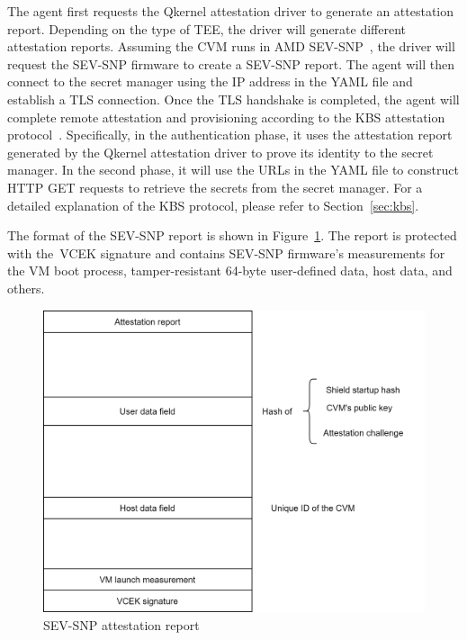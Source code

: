 The agent first requests the Qkernel attestation driver to generate an attestation report. Depending on the type of TEE, the driver will generate different attestation reports. Assuming the CVM runs in AMD SEV-SNP~\cite*{SEV_SNP_white_book}, the driver will request the SEV-SNP firmware to create a SEV-SNP report. The agent will then connect to the secret manager 
using the IP address in the YAML file and establish a TLS connection. Once the TLS handshake is completed, the agent will complete remote attestation and provisioning according to the KBS attestation protocol~\cite*{kbs_Attestation_protocol}. Specifically, in the authentication phase, it uses the attestation report generated by the Qkernel attestation driver to 
prove its identity to the secret manager. In the second phase, it will use the URLs in the YAML file to construct HTTP GET requests to retrieve the secrets from the secret manager. For a detailed explanation of the KBS protocol, please refer to Section~\ref{sec:kbs}.

The format of the SEV-SNP report is shown in Figure~\ref*{fig:attestation_report_format}. The report is protected with the~\acrshort{VCEK} signature and contains SEV-SNP firmware's measurements for the VM boot process, tamper-resistant 64-byte user-defined data, host data, and others. 


\begin{figure}[!htb]
    \centering
    \includegraphics[height=0.3\textheight]{images/attestation_report_format.png}
    \caption[SEV-SNP attestation report]{SEV-SNP attestation report~\cite*{snp_firmware}}
    \label{fig:attestation_report_format}
\end{figure}


